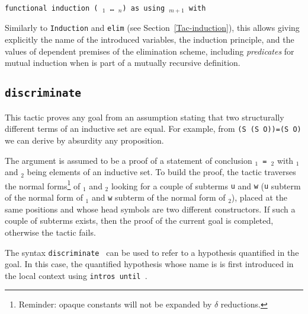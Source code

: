 \begin{coq_example*}
\SeeAlso{\ref{Function},\ref{FunScheme},\ref{FunScheme-examples},
  \ref{sec:functional-inversion}}

\begin{ErrMsgs}
\item {}
\item {}
\end{ErrMsgs}

\begin{Variants}
\item {\tt functional induction (\qualid\ \term$_1$ \dots\ \term$_n$)
  as {\disjconjintropattern} using \term$_{m+1}$ with \bindinglist}

 Similarly to \texttt{Induction} and \texttt{elim}
 (see Section~\ref{Tac-induction}), this allows giving explicitly the
 name of the introduced variables, the
 induction principle, and the values of dependent premises of the
 elimination scheme, including \emph{predicates} for mutual induction
 when {\qualid} is part of a mutually recursive definition.

\end{Variants}

\subsection{\tt discriminate \term}
\label{discriminate}


This tactic proves any goal from an assumption stating that two
structurally different terms of an inductive set are equal. For
example, from {\tt (S (S O))=(S O)} we can derive by absurdity any
proposition.

The argument {\term} is assumed to be a proof of a statement
of conclusion {\tt{\term$_1$} = {\term$_2$}} with {\term$_1$} and
{\term$_2$} being elements of an inductive set.  To build the proof,
the tactic traverses the normal forms\footnote{Reminder: opaque
  constants will not be expanded by $\delta$ reductions.} of
{\term$_1$} and {\term$_2$} looking for a couple of subterms {\tt u}
and {\tt w} ({\tt u} subterm of the normal form of {\term$_1$} and
{\tt w} subterm of the normal form of {\term$_2$}), placed at the same
positions and whose head symbols are two different constructors. If
such a couple of subterms exists, then the proof of the current goal
is completed, otherwise the tactic fails.

\Rem The syntax {\tt discriminate {\ident}} can be used to refer to a
hypothesis quantified in the goal. In this case, the quantified
hypothesis whose name is {\ident} is first introduced in the local
context using \texttt{intros until \ident}.


\end{coq_example*}
